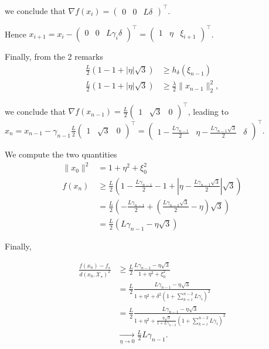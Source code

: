             we conclude that $\nabla f(x_i) = \begin{pmatrix} 0 & 0 & L\delta \end{pmatrix}^\top$.
            
            Hence $x_{i+1} = x_i - \begin{pmatrix} 0 & 0 & L \gamma_i \delta \end{pmatrix}^\top = \begin{pmatrix} 1 & \eta & \xi_{i+1} \end{pmatrix}^\top$.
            
            Finally, from the 2 remarks
            \begin{align}
                \frac{L}{2}(1 - 1 + |\eta|\sqrt{3}) & \geq h_{\delta}(\xi_{n-1}) \\
                \frac{L}{2}(1 - 1 + |\eta|\sqrt{3}) & \geq \frac{\lambda}{2}\|x_{n-1}\|_2^2,
            \end{align}
            
            we conclude that $\nabla f(x_{n-1}) = \frac{L}{2} \begin{pmatrix} 1 & \sqrt{3} & 0 \end{pmatrix}^\top$, leading to $x_n = x_{n-1} - \gamma_{n-1} \frac{L}{2} \begin{pmatrix} 1 & \sqrt{3} & 0 \end{pmatrix}^\top = \begin{pmatrix} 1 - \frac{L\gamma_{n-1}}{2} & \eta - \frac{L\gamma_{n-1}\sqrt{3}}{2} & \delta \end{pmatrix}^\top$.
            
            We compute the two quantities
            \begin{align}
                \|x_0\|^2 & = 1 + \eta^2 + \xi_0^2 \\
                f(x_n) & \geq \frac{L}{2}\left(1 - \frac{L\gamma_{n-1}}{2} - 1 + |\eta - \frac{L\gamma_{n-1}\sqrt{3}}{2}|\sqrt{3}\right) \nonumber \\
                & = \frac{L}{2}\left(- \frac{L\gamma_{n-1}}{2} + \left(\frac{L\gamma_{n-1}\sqrt{3}}{2} - \eta\right)\sqrt{3}\right) \nonumber \\
                & = \frac{L}{2}\left(L\gamma_{n-1} - \eta\sqrt{3}\right)
            \end{align}
            
            Finally,
            
            \begin{align}
                \frac{f(x_n) - f_\star}{d(x_0, \mathcal{X}_\star)^2} & \geq \frac{L}{2} \frac{L\gamma_{n-1} - \eta\sqrt{3}}{1 + \eta^2 + \xi_0^2} \nonumber \\
                & = \frac{L}{2} \frac{L\gamma_{n-1} - \eta\sqrt{3}}{1 + \eta^2 + \delta^2 \left( 1 + \sum_{k=i}^{n-2} L \gamma_i \right)^2} \nonumber \\
                & = \frac{L}{2} \frac{L\gamma_{n-1} - \eta\sqrt{3}}{1 + \eta^2 + \frac{\eta\sqrt{3}}{1+L\gamma_{n-2}} \left( 1 + \sum_{k=i}^{n-2} L \gamma_i \right)^2} \nonumber \\
                & \underset{\eta \rightarrow 0}{\longrightarrow} \frac{L}{2}L\gamma_{n-1}.
            \end{align}
            
